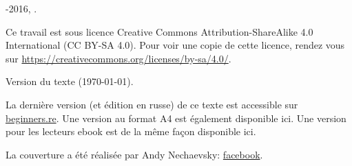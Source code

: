 ﻿\begin{titlepage}


\end{titlepage}

\newpage

\begin{center}
\vspace*{\fill}
{\LARGE \TITLE}

\vspace*{\fill}

{\large \AUTHOR}

{\large \TT{<\EMAIL>}}
\vspace*{\fill}
\vfill

\ccbysa

-2016, \AUTHOR. 

Ce travail est sous licence Creative Commons Attribution-ShareAlike 4.0 International (CC BY-SA 4.0).
Pour voir une copie de cette licence, rendez vous sur \url{https://creativecommons.org/licenses/by-sa/4.0/}.

Version du texte ({\large \today}).

La dernière version (et édition en russe) de ce texte est accessible sur \href{http://go.yurichev.com/17009}{beginners.re}.
\ifdefined\ebook
Une version au format A4 est également disponible ici.
\else
Une version pour les lecteurs ebook est de la même façon disponible ici.
\fi

La couverture a été réalisée par Andy Nechaevsky: \href{http://go.yurichev.com/17023}{facebook}.

\end{center}
